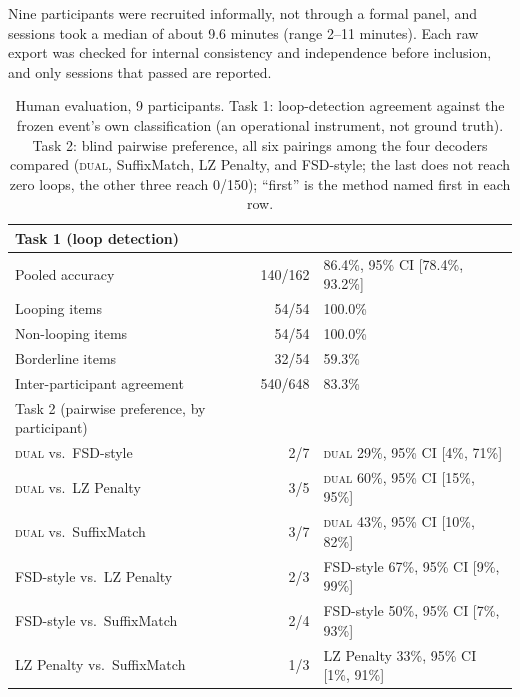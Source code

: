 Nine participants were recruited informally, not through a formal panel, and sessions took a median of about 9.6 minutes (range 2--11 minutes). Each raw export was checked for internal consistency and independence before inclusion, and only sessions that passed are reported.

\begin{table}[ht]
\centering
\caption{Human evaluation, 9 participants. Task 1: loop-detection agreement against the frozen event's own classification (an operational instrument, not ground truth). Task 2: blind pairwise preference, all six pairings among the four decoders compared (\textsc{dual}, SuffixMatch, LZ Penalty, and FSD-style; the last does not reach zero loops, the other three reach 0/150); ``first'' is the method named first in each row.}
\label{tab:humaneval}
\begin{tabular}{@{}lrl@{}}
\toprule
Task 1 (loop detection) & & \\
\midrule
Pooled accuracy & 140/162 & 86.4\%, 95\% CI [78.4\%, 93.2\%] \\
\quad Looping items & 54/54 & 100.0\% \\
\quad Non-looping items & 54/54 & 100.0\% \\
\quad Borderline items & 32/54 & 59.3\% \\
Inter-participant agreement & 540/648 & 83.3\% \\
\midrule
Task 2 (pairwise preference, by participant) & & \\
\midrule
\textsc{dual} vs.\ FSD-style & 2/7 & \textsc{dual} 29\%, 95\% CI [4\%, 71\%] \\
\textsc{dual} vs.\ LZ Penalty & 3/5 & \textsc{dual} 60\%, 95\% CI [15\%, 95\%] \\
\textsc{dual} vs.\ SuffixMatch & 3/7 & \textsc{dual} 43\%, 95\% CI [10\%, 82\%] \\
FSD-style vs.\ LZ Penalty & 2/3 & FSD-style 67\%, 95\% CI [9\%, 99\%] \\
FSD-style vs.\ SuffixMatch & 2/4 & FSD-style 50\%, 95\% CI [7\%, 93\%] \\
LZ Penalty vs.\ SuffixMatch & 1/3 & LZ Penalty 33\%, 95\% CI [1\%, 91\%] \\
\bottomrule
\end{tabular}


\end{table}

